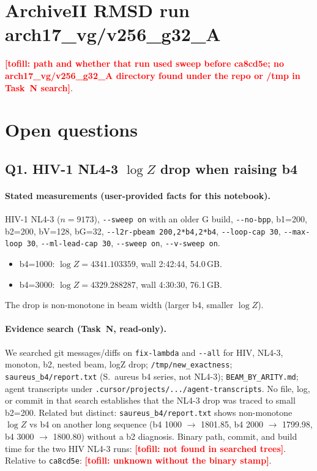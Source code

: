 \documentclass[11pt]{article}
\newcommand{\tofill}[1]{\textcolor{red}{\textbf{[tofill: #1]}}}
\begin{document}
\section{ArchiveII RMSD run arch17\_vg/v256\_g32\_A}
\tofill{path and whether that run used sweep before ca8cd5e; no arch17\_vg/v256\_g32\_A directory found under the repo or /tmp in Task~N search}.

\section{Open questions}
\subsection{Q1. HIV-1 NL4-3 $\log Z$ drop when raising b4}
\paragraph{Stated measurements (user-provided facts for this notebook).}
HIV-1 NL4-3 ($n{=}9173$), \texttt{-{}-sweep on} with an older G build, \texttt{-{}-no-bpp}, b1=200, b2=200, bV=128, bG=32, \texttt{-{}-l2r-pbeam 200,2*b4,2*b4}, \texttt{-{}-loop-cap 30}, \texttt{-{}-max-loop 30}, \texttt{-{}-ml-lead-cap 30}, \texttt{-{}-sweep on}, \texttt{-{}-v-sweep on}.
\begin{itemize}[leftmargin=*]
  \item b4=1000: $\log Z{=}4341.103359$, wall 2:42:44, 54.0\,GB.
  \item b4=3000: $\log Z{=}4329.288287$, wall 4:30:30, 76.1\,GB.
\end{itemize}
The drop is non-monotone in beam width (larger b4, smaller $\log Z$).

\paragraph{Evidence search (Task~N, read-only).}
We searched git messages/diffs on \texttt{fix-lambda} and \texttt{-{}-all} for HIV, NL4-3, monoton, b2, nested beam, logZ drop; \texttt{/tmp/new\_exactness}; \texttt{saureus\_b4/report.txt} (S.~aureus b4 series, not NL4-3); \texttt{BEAM\_BY\_ARITY.md}; agent transcripts under \texttt{.cursor/projects/.../agent-transcripts}. No file, log, or commit in that search establishes that the NL4-3 drop was traced to small b2=200. Related but distinct: \texttt{saureus\_b4/report.txt} shows non-monotone $\log Z$ vs b4 on another long sequence (b4 1000 ${\to}$ 1801.85, b4 2000 ${\to}$ 1799.98, b4 3000 ${\to}$ 1800.80) without a b2 diagnosis. Binary path, commit, and build time for the two HIV NL4-3 runs: \tofill{not found in searched trees}. Relative to \texttt{ca8cd5e}: \tofill{unknown without the binary stamp}.
\end{document}
